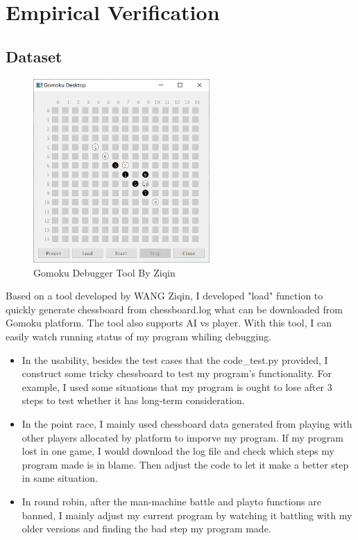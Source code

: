 \documentclass[lang=en,12pt]{elegantpaper}
\begin{document}
\section{Empirical Verification}
\subsection{Dataset}
\begin{figure}[ht]
	\centering
	\includegraphics[width=0.6\textwidth]{figure/tool.png}
	\caption{Gomoku Debugger Tool By Ziqin \label{fig:tool}}
\end{figure}
Based on a tool developed by WANG Ziqin, I developed "load" function to quickly generate chessboard from chessboard.log what can be downloaded from Gomoku platform.
The tool also supports AI vs player.
With this tool, I can easily watch running status of my program whiling debugging.
\begin{itemize}
  \item In the usability,
  besides the test cases that the code\_test.py provided,
  I construct some tricky chessboard to test my program's functionality.
  For example, I used some situations that my program is ought to lose after 3 steps to test whether it has long-term consideration.
  \item In the point race, I mainly used chessboard data generated from playing with other players allocated by platform to imporve my program.
  If my program lost in one game, I would download the log file and check which steps my program made is in blame.
  Then adjust the code to let it make a better step in same situation.
  \item In round robin, after the man-machine battle and playto functions are banned,
  I mainly adjust my current program by watching it battling with my older versions and finding the bad step my program made.
\end{itemize}
\end{document}
